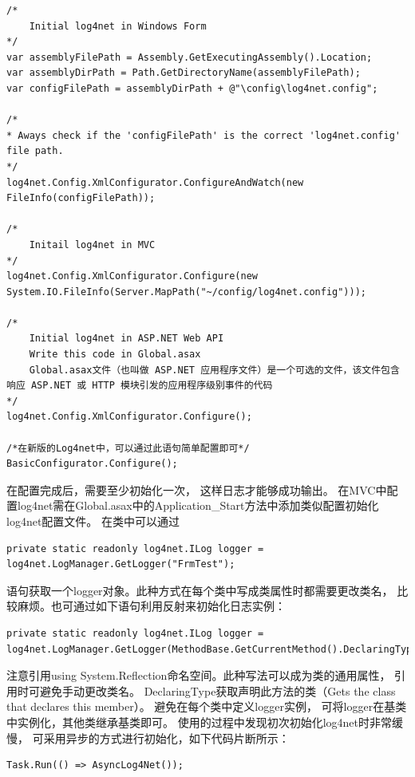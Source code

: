 \documentclass{book}
\begin{document}
\begin{lstlisting}[language={[Sharp]C}]
/*
	Initial log4net in Windows Form
*/
var assemblyFilePath = Assembly.GetExecutingAssembly().Location;
var assemblyDirPath = Path.GetDirectoryName(assemblyFilePath);
var configFilePath = assemblyDirPath + @"\config\log4net.config";

/*
* Aways check if the 'configFilePath' is the correct 'log4net.config' file path.
*/
log4net.Config.XmlConfigurator.ConfigureAndWatch(new FileInfo(configFilePath));

/*
	Initail log4net in MVC
*/
log4net.Config.XmlConfigurator.Configure(new System.IO.FileInfo(Server.MapPath("~/config/log4net.config")));

/*
	Initial log4net in ASP.NET Web API
	Write this code in Global.asax
	Global.asax文件（也叫做 ASP.NET 应用程序文件）是一个可选的文件，该文件包含响应 ASP.NET 或 HTTP 模块引发的应用程序级别事件的代码
*/
log4net.Config.XmlConfigurator.Configure(); 

/*在新版的Log4net中，可以通过此语句简单配置即可*/
BasicConfigurator.Configure();           
\end{lstlisting}

在配置完成后，需要至少初始化一次，
这样日志才能够成功输出。
在MVC中配置log4net需在Global.asax中的Application\_Start方法中添加类似配置初始化log4net配置文件。
在类中可以通过

\begin{lstlisting}[language={[Sharp]C}]
private static readonly log4net.ILog logger = log4net.LogManager.GetLogger("FrmTest");
\end{lstlisting}

语句获取一个logger对象。此种方式在每个类中写成类属性时都需要更改类名，
比较麻烦。也可通过如下语句利用反射来初始化日志实例：

\begin{lstlisting}[language={[Sharp]C}]
private static readonly log4net.ILog logger = log4net.LogManager.GetLogger(MethodBase.GetCurrentMethod().DeclaringType);
\end{lstlisting}

注意引用using System.Reflection命名空间。此种写法可以成为类的通用属性，
引用时可避免手动更改类名。
DeclaringType获取声明此方法的类（Gets the class that declares this member）。
避免在每个类中定义logger实例，
可将logger在基类中实例化，其他类继承基类即可。
使用的过程中发现初次初始化log4net时非常缓慢，
可采用异步的方式进行初始化，如下代码片断所示：

\begin{lstlisting}[language={[Sharp]C}]
Task.Run(() => AsyncLog4Net());
\end{lstlisting}
\end{document}
